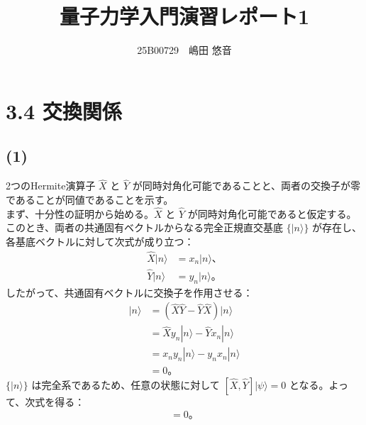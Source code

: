 \documentclass[platex,dvipdfmx,a4paper]{jsarticle}
\title{量子力学入門演習レポート1}
\author{25B00729　嶋田 悠音}
\begin{document}
\maketitle
\section*{3.4 交換関係}

\subsection*{(1)}

2つのHermite演算子 $\hat{X}$ と $\hat{Y}$ が同時対角化可能であることと、両者の交換子が零であることが同値であることを示す。\\
まず、十分性の証明から始める。$\hat{X}$ と $\hat{Y}$ が同時対角化可能であると仮定する。このとき、両者の共通固有ベクトルからなる完全正規直交基底 $\{|n\rangle\}$ が存在し、各基底ベクトルに対して次式が成り立つ：
\begin{align*}
  \hat{X}|n\rangle &= x_n|n\rangle、\\
  \hat{Y}|n\rangle &= y_n|n\rangle。
\end{align*}
したがって、共通固有ベクトルに交換子を作用させる：
\begin{align*}
  [\hat{X},\hat{Y}]|n\rangle
  &= \left(\hat{X}\hat{Y}-\hat{Y}\hat{X}\right)|n\rangle \\
  &= \hat{X}y_n|n\rangle-\hat{Y}x_n|n\rangle \\
  &= x_ny_n|n\rangle-y_nx_n|n\rangle \\
  &= 0。
\end{align*}
$\{|n\rangle\}$ は完全系であるため、任意の状態に対して $[\hat{X},\hat{Y}]|\psi\rangle=0$ となる。よって、次式を得る：
\begin{align*}
  [\hat{X},\hat{Y}]=0。
\end{align*}\\
\end{document}
